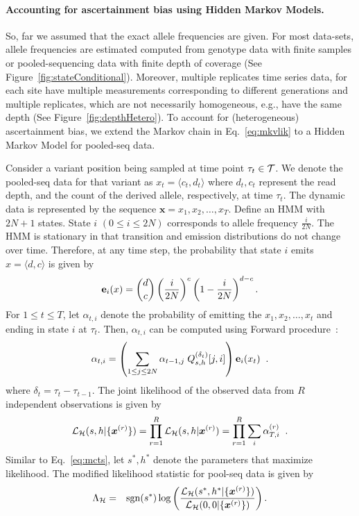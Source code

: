 \documentclass[11pt]{article}
\begin{document}
\paragraph{Accounting for ascertainment bias using Hidden Markov Models.}
So, far we assumed that the exact allele frequencies are given. For
most data-sets, allele frequencies are estimated computed from
genotype data with finite samples or pooled-sequencing data with
finite depth of coverage (See
Figure~\ref{fig:stateConditional}).
Moreover, multiple replicates time series data, for each site have
multiple measurements corresponding to different generations and
multiple replicates, which are not necessarily homogeneous, e.g., have
the same depth (See Figure~\ref{fig:depthHetero}). To account for
(heterogeneous) ascertainment bias, we extend the Markov chain in
Eq.~\ref{eq:mkvlik} to a Hidden Markov Model for pooled-seq data.

Consider a variant position being sampled at time point $\tau_t\in
{\cal T}$. We denote the pooled-seq data for that variant as $x_t =
\langle c_t,d_t \rangle$ where $d_t, c_t$ represent the read depth,
and the count of the derived allele, respectively, at time
$\tau_t$. The dynamic data is represented by the sequence
$\mathbf{x}=x_1,x_2,\ldots,x_T$. Define an HMM with $2N+1$
states. State $i$ $(0\le i\le 2N)$ corresponds to allele frequency
$\frac{i}{2N}$. The HMM is stationary in that transition and emission
distributions do not change over time. Therefore, at any time step,
the probability that state $i$ emits $x=\langle d, c\rangle $ is given by
\begin{equation*}
{\bf e}_{i}(x) = {d \choose c} \left(\frac{i}{2N} \right)^c\left (1- \frac{i}{2N} \right)^{d-c}.
\end{equation*}
For $1\le t\le T$, let $\alpha_{t,i}$ denote the probability of
emitting the $x_1,x_2,\ldots,x_t$ and ending in state $i$ at
$\tau_t$. Then, $\alpha_{t,i}$ can be computed using Forward
procedure~\cite{durbin1998biological}:
\begin{equation}
  \alpha_{t,i} = \left( \sum_{1\le j\le 2N} \alpha_{t-1,j}\;Q^{(\delta_t)}_{s,h}[j,i] \right) {\bf e}_{i}(x_t)\;\; .
  \label{eq:hmm}
\end{equation}
where $\delta_t=\tau_t-\tau_{t-1}$. The joint likelihood of the
observed data from $R$ independent observations is given by
\begin{equation}
  {\cal L}_{{\cal H}}(s,h|\{\bm{x}^{(r)}\})=\prod_{r=1}^R{\cal L}_{{\cal H}}(s,h|\bm{x}^{(r)}) = \prod_{r=1}^R \sum_i\alpha_{T,i}^{(r)}\;\;.
  \label{eq:hmmlik}
\end{equation}
Similar to Eq.~\ref{eq:mcts}, let $s^*,h^*$ denote the parameters that
maximize likelihood. The modified likelihood statistic for pool-seq
data is given by
\begin{eqnarray}
\Lambda_{\cal H} &=& \operatorname{sgn}(s^*)\log 
\left(\frac{{\cal L}_{\cal H}(s^*,h^*|\{\bm{x}^{(r)}\})}{{\cal L}_{\cal H}(0,0|\{\bm{x}^{(r)}\})}\right).
\label{eq:hmmml}
\end{eqnarray}
\end{document}
